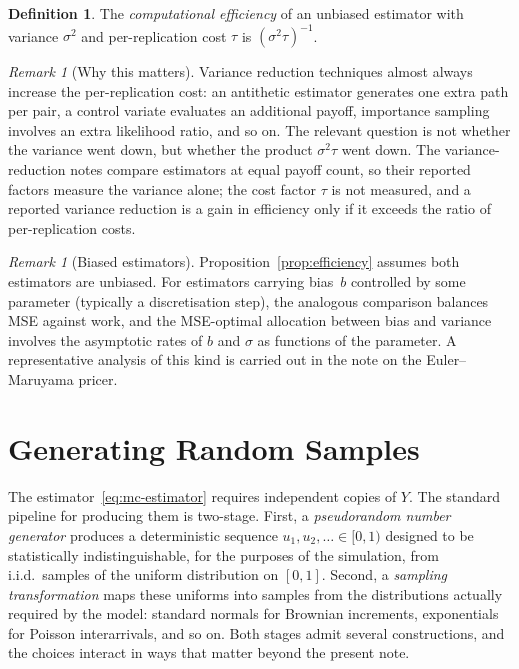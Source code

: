 \documentclass[11pt,a4paper]{article}
\theoremstyle{plain}
\theoremstyle{definition}
\newtheorem{definition}[theorem]{Definition}
\theoremstyle{remark}
\newtheorem{remark}[theorem]{Remark}
\begin{document}
\begin{definition}
The \emph{computational efficiency} of an unbiased estimator with
variance $\sigma^2$ and per-replication cost $\tau$ is
$(\sigma^2 \tau)^{-1}$.
\end{definition}

\begin{remark}[Why this matters]
Variance reduction techniques almost always increase the per-replication
cost: an antithetic estimator generates one extra path per pair, a
control variate evaluates an additional payoff, importance sampling
involves an extra likelihood ratio, and so on. The relevant question is
not whether the variance went down, but whether the product
$\sigma^2 \tau$ went down. The variance-reduction notes compare
estimators at equal payoff count, so their reported factors measure the
variance alone; the cost factor $\tau$ is not measured, and a reported
variance reduction is a gain in efficiency only if it exceeds the ratio
of per-replication costs.
\end{remark}

\begin{remark}[Biased estimators]
Proposition~\ref{prop:efficiency} assumes both estimators are unbiased.
For estimators carrying bias~$b$ controlled by some parameter (typically
a discretisation step), the analogous comparison balances MSE against
work, and the MSE-optimal allocation between bias and variance involves
the asymptotic rates of $b$ and $\sigma$ as functions of the parameter.
A representative analysis of this kind is carried out in the note on
the Euler--Maruyama pricer.
\end{remark}

\section{Generating Random Samples}
\label{sec:sampling}

The estimator~\eqref{eq:mc-estimator} requires independent copies of
$Y$. The standard pipeline for producing them is two-stage. First, a
\emph{pseudorandom number generator} produces a deterministic sequence
$u_1, u_2, \dots \in [0,1)$ designed to be statistically
indistinguishable, for the purposes of the simulation, from i.i.d.\
samples of the uniform distribution on $[0,1]$. Second, a
\emph{sampling transformation} maps these uniforms into samples from
the distributions actually required by the model: standard normals for
Brownian increments, exponentials for Poisson interarrivals, and so on.
Both stages admit several constructions, and the choices interact in
ways that matter beyond the present note.
\end{document}
